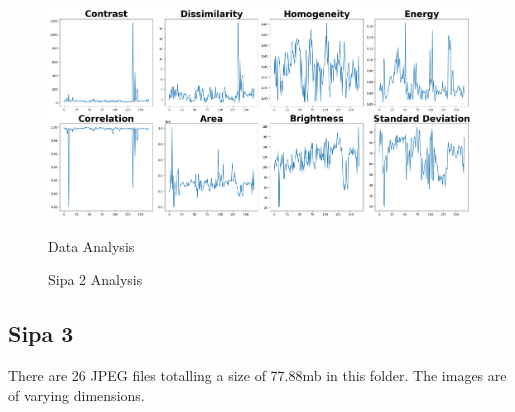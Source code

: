 \begin{figure}[ht]
\begin{minipage}[t]{0.50\textwidth}
        \centering
        \includegraphics[width=\textwidth]{Figures/EDA_Charts/2/da.png}
        \caption*{Data Analysis}
    \end{minipage}
    \caption{Sipa 2 Analysis}
    \label{fig:Sipa 2 Analysis}
\end{figure}


\subsection{Sipa 3}

There are 26 JPEG files totalling a size of 77.88mb in this folder. The images are of varying dimensions.

